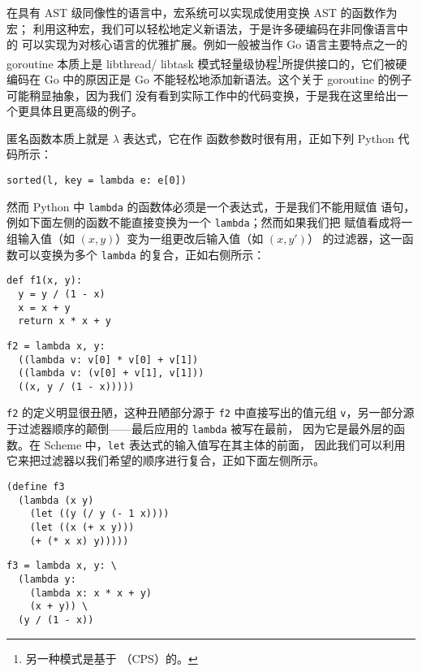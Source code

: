 在具有 AST 级同像性的语言中，宏系统可以实现成使用变换 AST 的函数作为宏；
利用这种宏，我们可以轻松地定义新语法，于是许多硬编码在非同像语言中的%
可以实现为对核心语言的优雅扩展。例如一般被当作 Go
语言主要特点之一的 goroutine 本质上是 libthread/%
libtask 模式轻量级协程\footnote{\label{fn:cps}%
另一种模式是基于%
（CPS）的。}所提供接口的，它们被硬编码在 Go 中的原因正是
Go 不能轻松地添加新语法。这个关于 goroutine 的例子可能稍显抽象，因为我们
没有看到实际工作中的代码变换，于是我在这里给出一个更具体且更高级的例子。

匿名函数本质上就是 $\lambda$ 表达式，它在作
函数参数时很有用，正如下列 Python 代码所示：
\begin{wquoting}
\begin{Verbatim}
sorted(l, key = lambda e: e[0])
\end{Verbatim}
\end{wquoting}
然而 Python 中 \verb|lambda| 的函数体必须是一个表达式，于是我们不能用赋值
语句，例如下面左侧的函数不能直接变换为一个 \verb|lambda|；然而如果我们把
赋值看成将一组输入值（如 $(x, y)$）变为一组更改后输入值（如 $(x, y')$）
的过滤器，这一函数可以变换为多个 \verb|lambda| 的复合，正如右侧所示：
\colskipa\begin{multicols}{2}
\begin{wquoting}
\begin{Verbatim}
def f1(x, y):
  y = y / (1 - x)
  x = x + y
  return x * x + y
\end{Verbatim}
\end{wquoting}
\begin{wquoting}
\begin{Verbatim}
f2 = lambda x, y:
  ((lambda v: v[0] * v[0] + v[1])
  ((lambda v: (v[0] + v[1], v[1]))
  ((x, y / (1 - x)))))
\end{Verbatim}
\end{wquoting}
\end{multicols}\colskipb\noindent%
\verb|f2| 的定义明显很丑陋，这种丑陋部分源于 \verb|f2| 中直接写出的值元组
\verb|v|，另一部分源于过滤器顺序的颠倒——最后应用的 \verb|lambda| 被写在最前，
因为它是最外层的函数。在 Scheme 中，\verb|let| 表达式的输入值写在其主体的前面，
因此我们可以利用它来把过滤器以我们希望的顺序进行复合，正如下面左侧所示。
\colskipa\begin{multicols}{2}
\begin{wquoting}
\begin{Verbatim}
(define f3
  (lambda (x y)
    (let ((y (/ y (- 1 x))))
    (let ((x (+ x y)))
    (+ (* x x) y)))))
\end{Verbatim}
\end{wquoting}
\begin{wquoting}
\begin{Verbatim}
f3 = lambda x, y: \
  (lambda y:
    (lambda x: x * x + y)
    (x + y)) \
  (y / (1 - x))
\end{Verbatim}
\end{wquoting}
\end{multicols}\colskipb\noindent%
